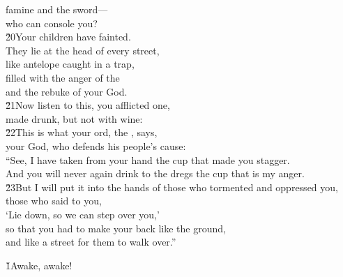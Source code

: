 \begin{poetry}
\poemll    famine and the sword--- \\
\poemlll       who can console you? \\
\poeml \v{20}Your children have fainted. \\
\poemll    They lie at the head of every street, \\
\poemlll       like antelope caught in a trap, \\
\poeml filled with the anger of the  \\
\poemll    and the rebuke of your God. \\
\poeml \v{21}Now listen to this, you afflicted one, \\
\poemll    made drunk, but not with wine: \\
\poeml \v{22}This is what your  ord, the , says, \\
\poemll    your God, who defends his people's cause: \\
\poeml ``See, I have taken from your hand the cup that made you stagger. \\
\poemll    And you will never again drink to the dregs the cup that is my anger. \\
\poeml \v{23}But I will put it into the hands of those who tormented and oppressed you, \\
\poemll    those who said to you, \\
\poeml `Lie down, so we can step over you,' \\
\poemll    so that you had to make your back like the ground, \\
\poemlll       and like a street for them to walk over.''
\end{poetry}

\v{1}Awake, awake!

